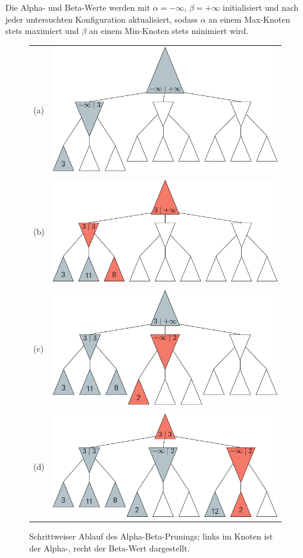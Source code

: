 \documentclass[a4paper]{scrartcl}
\begin{document}
Die Alpha- und Beta-Werte werden mit $\alpha = -\infty$, $\beta = +\infty$ initialisiert und nach jeder untersuchten Konfiguration aktualisiert, sodass $\alpha$ an einem Max-Knoten stets maximiert und $\beta$ an einem Min-Knoten stets minimiert wird.

\begin{figure}[!ht]
  \centering
  \begin{tabular}{ll}
    (a) & \includegraphics[width=.6\textwidth]{minmax_alphabeta_1.pdf}\\
        & \\
    (b) & \includegraphics[width=.6\textwidth]{minmax_alphabeta_3.pdf}\\
        & \\
    (c) & \includegraphics[width=.6\textwidth]{minmax_alphabeta_4.pdf}\\
        & \\
    (d) & \includegraphics[width=.6\textwidth]{minmax_alphabeta_6.pdf}\\
  \end{tabular}
  \caption{Schrittweiser Ablauf des Alpha-Beta-Prunings; links im Knoten ist der Alpha-, recht der Beta-Wert dargestellt.\label{fig:alphabeta}}
\end{figure}
\end{document}
